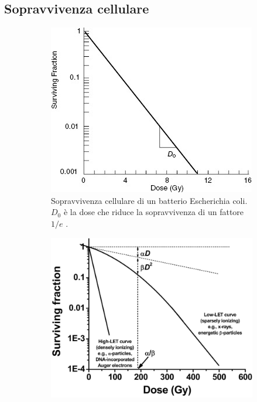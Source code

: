 \documentclass[12pt,a4paper,twoside]{report}
\begin{document}
	\subsection{Sopravvivenza cellulare}\label{sec:sopravvivenza_cellulare}
	\begin{figure}[H]
		\centering
		\begin{subfigure}[t]{0.49\textwidth}
			\centering
			\includegraphics[width=\textwidth, scale=0.50]{survival1.jpg}
			\caption{Sopravvivenza cellulare di un batterio Escherichia coli. $D_0$ è la dose che riduce la sopravvivenza di un fattore $1/e$ \cite{rad_key2}.}
			\label{fig:survival1}
		\end{subfigure}
		\hfill
		\begin{subfigure}[t]{0.49\textwidth}
			\centering
			\includegraphics[width=\textwidth, scale=0.50]{survival2.png}

\end{subfigure}
\end{figure}
\end{document}

